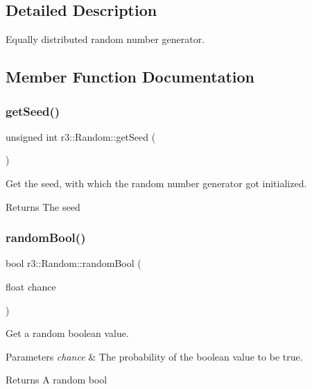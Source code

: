 \subsection{Detailed Description}
Equally distributed random number generator. 

\subsection{Member Function Documentation}
\mbox{\label{classr3_1_1_random_a5d1f4fef27e14bde1e3b560728b7d3ba}} 
\subsubsection{\texorpdfstring{get\+Seed()}{getSeed()}}
{\footnotesize\ttfamily unsigned int r3\+::\+Random\+::get\+Seed (\begin{DoxyParamCaption}{ }\end{DoxyParamCaption})\hspace{0.3cm}{\ttfamily [static]}}



Get the seed, with which the random number generator got initialized. 

\begin{DoxyReturn}{Returns}
The seed 
\end{DoxyReturn}
\mbox{\label{classr3_1_1_random_a7b9dd03194e79fac4374e16c0b2ad03f}} 
\subsubsection{\texorpdfstring{random\+Bool()}{randomBool()}}
{\footnotesize\ttfamily bool r3\+::\+Random\+::random\+Bool (\begin{DoxyParamCaption}\item[{float}]{chance }\end{DoxyParamCaption})\hspace{0.3cm}{\ttfamily [static]}}



Get a random boolean value. 


\begin{DoxyParams}{Parameters}
{\em chance} & The probability of the boolean value to be true. \\
\hline
\end{DoxyParams}
\begin{DoxyReturn}{Returns}
A random bool 
\end{DoxyReturn}
\mbox{\label{classr3_1_1_random_a69d200d316daad8cfa6efdd1196a2c38}} 
